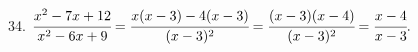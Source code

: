 34. $\cfrac{x^2-7x+12}{x^2-6x+9}=\cfrac{x(x-3)-4(x-3)}{(x-3)^2}=\cfrac{(x-3)(x-4)}{(x-3)^2}=\cfrac{x-4}{x-3}.$\\
